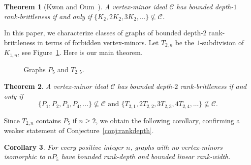 \documentclass[11pt]{article}
\newtheorem{theorem}{Theorem}[section]
\newtheorem{corollary}[theorem]{Corollary}
\begin{document}
        \begin{theorem}[Kwon and Oum~\cite{KO2018sca}]
          A vertex-minor ideal $\mathcal C$ 
          has bounded depth-$1$ rank-brittleness if and only if
          $\{K_2,2K_2,3K_2,\ldots\}\not\subseteq \mathcal C$.
        \end{theorem}
		
	In this paper, we characterize classes of graphs of bounded depth-$2$ rank-brittleness in terms of forbidden vertex-minors.
	Let $T_{2,n}$ be the $1$-subdivision of $K_{1,n}$, see Figure~\ref{fig:t25}.
        Here is our main theorem.

        \begin{figure}\label{fig:t25}
          \centering
          \qquad\qquad
          \caption{Graphs $P_5$ and $T_{2,5}$.}
          \label{fig:t25}
        \end{figure}
        
		\begin{theorem}\label{thm:main}
		A vertex-minor ideal $\mathcal{C}$ has bounded depth-$2$ rank-brittleness if and only if 
		\[ \{P_1, P_2, P_3, P_4, \ldots \}\nsubseteq \mathcal{C}
                \text{ and }
		 \{T_{2,1}, 2T_{2,2}, 3T_{2,3}, 4T_{2,4}, \ldots \}\nsubseteq \mathcal{C}. \]
       		\end{theorem}

                Since  $T_{2,n}$ contains $P_5$ if $n\ge 2$,
                we obtain the following corollary,
                confirming a weaker statement of Conjecture~\ref{conj:rankdepth}.
	
	\begin{corollary}\label{cor:lrw}
          For every positive integer $n$,
          graphs with no vertex-minors isomorphic to $nP_5$
          have bounded rank-depth and bounded linear rank-width.
	\end{corollary}
	
\end{document}
